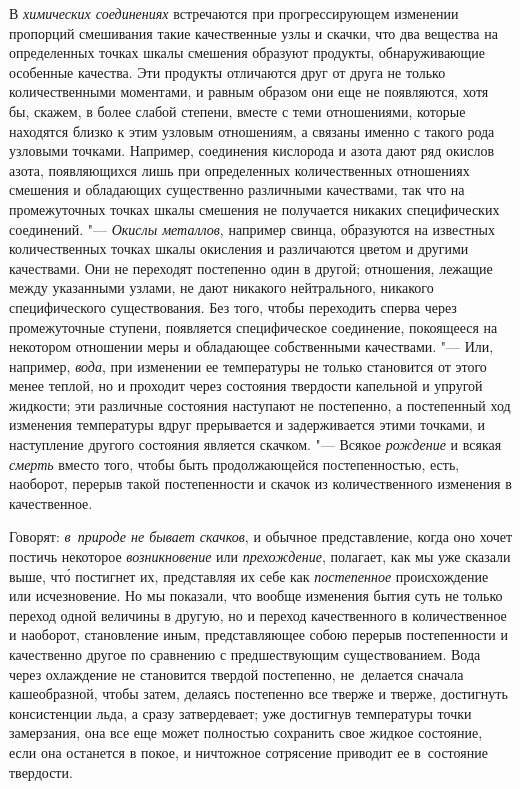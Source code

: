 В {\em химических соединениях} встречаются при прогрессирующем изменении
пропорций смешивания такие качественные узлы и скачки, что два вещества на
определенных точках шкалы смешения образуют продукты, обнаруживающие особенные
качества. Эти продукты отличаются друг от друга не только количественными
моментами, и равным образом они еще не появляются, хотя бы, скажем, в более
слабой степени, вместе с теми отношениями, которые находятся близко к этим
узловым отношениям, а связаны именно с такого рода узловыми точками. Например,
соединения кислорода и азота дают ряд окислов азота, появляющихся лишь при
определенных количественных отношениях смешения и обладающих существенно
различными качествами, так что на промежуточных точках шкалы смешения не
получается никаких специфических соединений. "--- {\em Окислы металлов},
например свинца, образуются на известных количественных точках шкалы окисления
и различаются цветом и другими качествами. Они не переходят постепенно один в
другой; отношения, лежащие между указанными узлами, не дают никакого
нейтрального, никакого специфического существования. Без того, чтобы переходить
сперва через промежуточные ступени, появляется специфическое соединение,
покоящееся на некотором отношении меры и обладающее собственными качествами.
"--- Или, например, {\em вода}, при изменении ее температуры не только
становится от этого менее теплой, но и проходит через состояния твердости
капельной и упругой жидкости; эти различные состояния наступают не постепенно,
а постепенный ход изменения температуры вдруг прерывается и задерживается этими
точками, и наступление другого состояния является скачком. "--- Всякое
{\em рождение} и всякая {\em смерть} вместо того, чтобы быть продолжающейся
постепенностью, есть, наоборот, перерыв такой постепенности и скачок из
количественного изменения в качественное.

Говорят: {\em в~природе не бывает скачков}, и обычное представление, когда оно
хочет постичь некоторое {\em возникновение} или {\em прехождение}, полагает,
как мы уже сказали выше, чт\'{о} постигнет их, представляя их себе как
{\em постепенное} происхождение или исчезновение. Но мы показали, что вообще
изменения бытия суть не только переход одной величины в другую, но и переход
качественного в количественное и наоборот, становление иным, представляющее
собою перерыв постепенности и качественно другое по сравнению с предшествующим
существованием. Вода через охлаждение не становится твердой постепенно,
не~делается сначала кашеобразной, чтобы затем, делаясь постепенно все тверже и
тверже, достигнуть консистенции льда, а сразу затвердевает; уже достигнув
температуры точки замерзания, она все еще может полностью сохранить свое жидкое
состояние, если она останется в покое, и ничтожное сотрясение приводит ее
в~состояние твердости.


